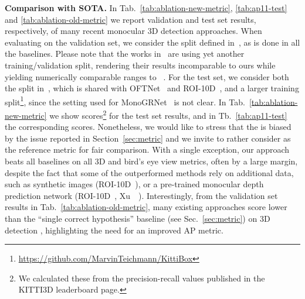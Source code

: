 \documentclass[10pt,twocolumn,letterpaper]{article}
\renewcommand{\paragraph}[1]{

        \vspace{3pt}
	\noindent\textbf{#1}}
\begin{document}
\paragraph{Comparison with SOTA.}
In Tab.~\ref{tab:ablation-new-metric}, \ref{tab:ap11-test} and \ref{tab:ablation-old-metric} we report validation and test set results, respectively, of many recent monocular 3D detection approaches.
When evaluating on the validation set, we consider the split defined in~\cite{NIPS2015_Chen}, as is done in all the baselines. Please note that the works in~\cite{Xiang_2015_CVPR,Mousavian_2017_CVPR,Xiang_2017_WACV} are using yet another training/validation split, rendering their results incomparable to ours while yielding numerically comparable ranges to \eg~\cite{Liu+19}.
For the test set, we consider both the split in~\cite{NIPS2015_Chen}, which is shared with OFTNet~\cite{Roddick18} and ROI-10D~\cite{Manhardt_2019_CVPR}, and a larger training split\footnote{\url{https://github.com/MarvinTeichmann/KittiBox}}, since the setting used for MonoGRNet~\cite{qin2019monogrnet} is not clear.
In Tab.~\ref{tab:ablation-new-metric} we show  scores\footnote{We calculated these from the precision-recall values published in the KITTI3D leaderboard page.} for the test set results, and in Tb.~\ref{tab:ap11-test} the corresponding  scores.
Nonetheless, we would like to stress that the  is biased by the issue reported in Section~\ref{sec:metric} and we invite to rather consider  as the reference metric for fair comparison.
With a single exception, our approach beats all baselines on all 3D and bird's eye view metrics, often by a large margin, despite the fact that
some of the outperformed methods rely on additional data, such as synthetic images (ROI-10D~\cite{Manhardt_2019_CVPR}), or a pre-trained monocular depth prediction network (ROI-10D~\cite{Manhardt_2019_CVPR}, Xu~\etal~\cite{Xu_2018_CVPR}).
Interestingly, from the validation set results in Tab.~\ref{tab:ablation-old-metric}, many existing approaches score lower than the ``single correct hypothesis'' baseline (see Sec.~\ref{sec:metric}) on 3D detection , highlighting the need for an improved AP metric.
\newcommand{\gc}{0.9}
\end{document}
